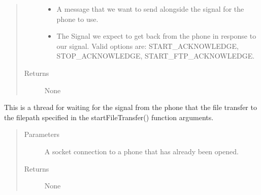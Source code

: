 \documentclass[letterpaper,10pt,english]{sphinxmanual}
\begin{document}
\begin{fulllineitems}
\begin{fulllineitems}
\begin{quote}
\begin{description}
\begin{itemize}
\item {} 
 \textendash{} A message that we want to send alongside the signal for the phone to use.

\item {} 
 \textendash{} The Signal we expect to get back from the phone in response to our signal. Valid options are: START\_ACKNOWLEDGE, STOP\_ACKNOWLEDGE, START\_FTP\_ACKNOWLEDGE.

\end{itemize}

\item[{Returns}] \leavevmode
None

\end{description}\end{quote}

\end{fulllineitems}


\begin{fulllineitems}
\label{\detokenize{index:src.Controllers.PhoneController.PhoneControl.threadWaitForFileTransfer}}
This is a thread for waiting for the signal from the phone that the file transfer to the filepath specified
in the startFileTransfer() function arguments.
\begin{quote}\begin{description}
\item[{Parameters}] \leavevmode
{} \textendash{} A socket connection to a phone that has already been opened.

\item[{Returns}] \leavevmode
None

\end{description}\end{quote}

\end{fulllineitems}



\end{fulllineitems}
\end{document}
